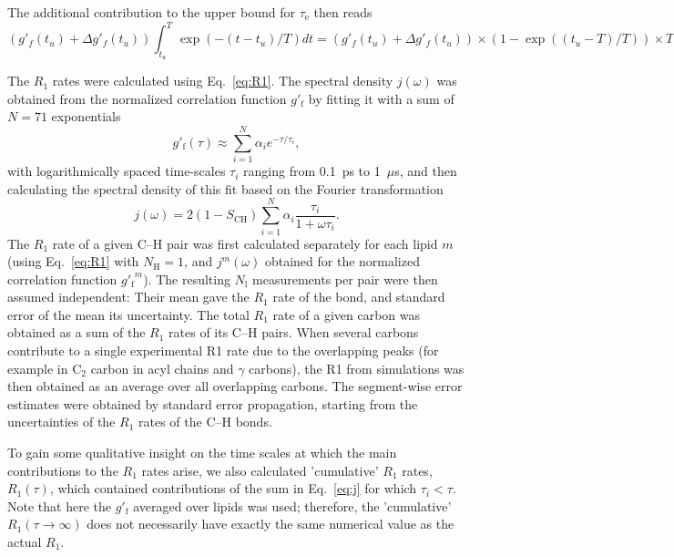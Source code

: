 \documentclass[journal=jcisd8,manuscript=article,layout=twocolumn]{achemso}
\begin{document}
The additional contribution to the upper bound for $\tau_\mathrm e$ then reads
\begin{equation}
\left( g'_f(t_u)+\Delta g'_f(t_u) \right)
\int_{t_u}^T \exp(-(t-t_u)/T) dt
=
\left( g'_f(t_u)+\Delta g'_f(t_u) \right)
\times
( 1 - \exp( (t_u-T)/T ) )
\times T
\end{equation}


The $R_{1}$ rates were calculated using Eq.~\eqref{eq:R1}.
%
The spectral density $j(\omega)$ was obtained from the normalized correlation function $g'_\mathrm f$
by fitting it with a sum of $N=71$ exponentials
\begin{equation}
\label{eq:weights}
g'_\mathrm{f}(\tau)\approx\sum_{i=1}^{N}\alpha_{i}e^{-\tau/\tau_{i}},
\end{equation}
with logarithmically spaced time-scales $\tau_{i}$ ranging from 0.1~ps to 1~$\mu$s, 
and then calculating the spectral density of this fit
based on the Fourier transformation\cite{ferreira15}
\begin{equation}
\label{eq:j}
j{(\omega)}=2(1-S_\mathrm{CH})\sum_{i=1}^{N}\alpha_{i}\frac{\tau_{i}}{1+\omega\tau_{i}} .
\end{equation}
%
The $R_{1}$ rate of a given C--H pair was
first calculated separately for each lipid $m$ (using Eq.~\eqref{eq:R1} with $N_\mathrm{H}=1$, and $j^m(\omega)$ obtained for the normalized correlation function ${g'_\mathrm f}^m$). The resulting $N_\mathrm{l}$ measurements per pair were then assumed independent:
Their mean gave the $R_1$ rate of the bond, and 
standard error of the mean its uncertainty.
%
The total $R_1$ rate of a given carbon was obtained as a sum of the $R_1$ rates of its C--H pairs.
%
When several carbons contribute to a single experimental R1 rate due to the overlapping peaks (for example in C$_2$ carbon in acyl chains and $\gamma$ carbons),
the R1 from simulations was then obtained as an average over all overlapping carbons.
%
The segment-wise error estimates were obtained by standard error propagation, starting from the uncertainties of the $R_1$ rates of the C--H bonds.

To gain some qualitative insight on the time scales at which the main contributions to the $R_1$ rates arise,
we also calculated 'cumulative' $R_1$ rates, $R_1(\tau)$, which contained contributions of the sum in Eq.~\eqref{eq:j} for which $\tau_i<\tau$.
Note that here the $g'_\mathrm{f}$ averaged over lipids was used;
therefore, the 'cumulative' $R_1(\tau\to\infty)$ does not necessarily have exactly
the same numerical value as the actual $R_1$.
\end{document}
